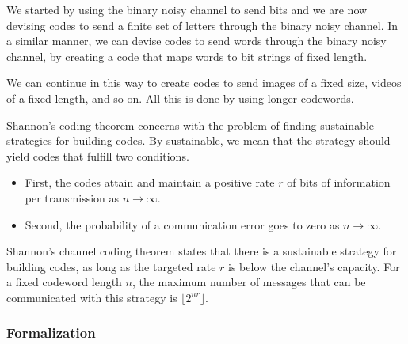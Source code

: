 We started by using the binary noisy channel to send bits and we are now devising codes to send a finite set of letters through the binary noisy channel. In a similar manner, we can devise codes to send words through the binary noisy channel, by creating a code that maps words to bit strings of fixed length.

We can continue in this way to create codes to send images of a fixed size, videos of a fixed length, and so on.%
All this is done by using longer codewords. 


Shannon's coding theorem concerns with the problem of finding sustainable strategies for building codes. By sustainable, we mean that the strategy should yield codes that fulfill two conditions. 
%
\begin{itemize}
\item First, the codes attain and maintain a positive rate $r$ of bits of information per transmission as $n \to \infty$.
\item Second, the probability of a communication error goes to zero as $n \to \infty$.
\end{itemize}

Shannon's channel coding theorem states that there is a sustainable strategy for building codes, as long as the targeted rate $r$ is below the channel's capacity. For a fixed codeword length $n$, the maximum number of messages that can be communicated with this strategy is $\lfloor 2^{nr}\rfloor$.

\subsubsection*{Formalization}

